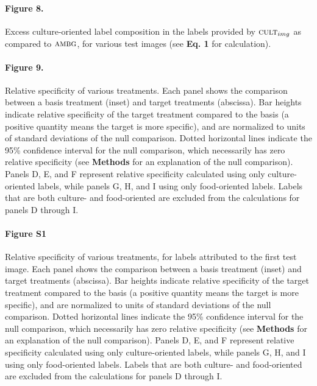 \documentclass[a4paper]{report}
\begin{document}
\paragraph{Figure 8.}
Excess culture-oriented label composition in the labels provided
by $\textsc{cult}_{img}$ as compared to $\textsc{ambg}$, for various
test images (see \textbf{Eq. 1} for calculation).

\paragraph{Figure 9.}
Relative specificity of various treatments.
Each panel shows the comparison between a basis treatment (inset) and 
target treatments (abscissa).
Bar heights indicate relative specificity of the target 
treatment compared to the basis (a positive quantity means the target 
is more specific), and are normalized to units of standard 
deviations of the null comparison.  Dotted horizontal lines indicate
the 95\% confidence interval for the null comparison, which necessarily
has zero relative specificity (see \textbf{Methods} 
for an explanation of the null comparison).  Panels D, E, and F 
represent relative specificity calculated using only culture-oriented
labels, while panels G, H, and I using only food-oriented labels.
Labels that are both culture- and food-oriented are excluded from the
calculations for panels D through I.

\paragraph{Figure S1}
Relative specificity of various treatments, for labels attributed
to the first test image.
Each panel shows the comparison between a basis treatment (inset) and 
target treatments (abscissa).
Bar heights indicate relative specificity of the target 
treatment compared to the basis (a positive quantity means the target 
is more specific), and are normalized to units of standard 
deviations of the null comparison.  Dotted horizontal lines indicate
the 95\% confidence interval for the null comparison, which necessarily
has zero relative specificity (see \textbf{Methods} 
for an explanation of the null comparison).  Panels D, E, and F 
represent relative specificity calculated using only culture-oriented
labels, while panels G, H, and I using only food-oriented labels.
Labels that are both culture- and food-oriented are excluded from the
calculations for panels D through I.
\end{document}
